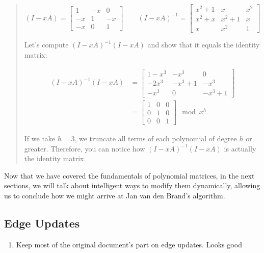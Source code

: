 \documentclass[12pt]{article}
\begin{document}
\begin{quote}
    \[
        (I - xA) =
        \begin{bmatrix}
            1 & -x & 0 \\
            -x & 1 & -x \\
            -x & 0 & 1
        \end{bmatrix}
        \qquad
        (I - xA)^{-1} =
        \begin{bmatrix}
            x^2 + 1 & x & x^2 \\
            x^2 + x & x^2 + 1 & x \\
            x & x^2 & 1
        \end{bmatrix}
    \]

    Let's compute $(I - xA)^{-1} (I - xA)$ and show that it equals the identity matrix:

    \[
        \begin{split}
            (I - xA)^{-1} (I - xA) &=
            \begin{bmatrix}
                1 - x^3 & -x^3 & 0 \\
                -2x^3 & -x^3 + 1 & -x^3 \\
                -x^3 & 0 & -x^3 + 1
            \end{bmatrix} \\
            &=
            \begin{bmatrix}
                1 & 0 & 0 \\
                0 & 1 & 0 \\
                0 & 0 & 1
            \end{bmatrix}
            \mod x^h
        \end{split}
    \]

    If we take $h = 3$, we truncate all terms of each polynomial of degree $h$ or greater. Therefore, you can notice how $(I - xA)^{-1} (I - xA)$ is actually the identity matrix.
\end{quote}

Now that we have covered the fundamentals of polynomial matrices, in the next sections, we will talk about intelligent ways to modify them dynamically, allowing us to conclude how we might arrive at Jan van den Brand's algorithm.

\subsection{Edge Updates}

\begin{enumerate}
    \item Keep most of the original document's part on edge updates. Looks good
\end{enumerate}
\end{document}
